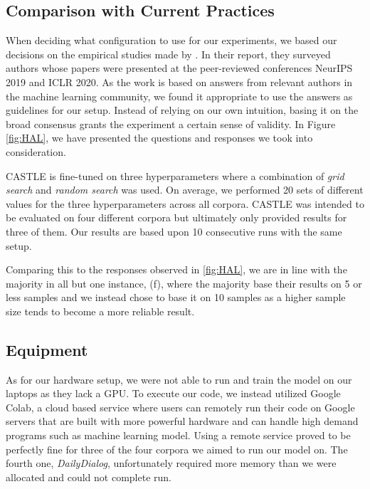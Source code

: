 \documentclass[nofilelist]{cslthse-msc}
\begin{document}
\subsection{Comparison with Current Practices}
When deciding what configuration to use for our experiments, we based our decisions on the empirical studies made by  \citet{bouthillier:hal-02447823}. In their report, they surveyed authors whose papers were presented at the peer-reviewed conferences NeurIPS 2019 and ICLR 2020. As the work is based on answers from relevant authors in the machine learning community, we found it appropriate to use the answers as guidelines for our setup. Instead of relying on our own intuition, basing it on the broad consensus grants the experiment a certain sense of validity. In Figure \ref{fig:HAL}, we have presented the questions and responses we took into consideration.

CASTLE is fine-tuned on three hyperparameters where a combination of \textit{grid search} and \textit{random search} was used. On average, we performed 20 sets of different values for the three hyperparameters across all corpora. CASTLE was intended to be evaluated on four different corpora but ultimately only provided results for three of them. Our results are based upon 10 consecutive runs with the same setup. 

Comparing this to the responses observed in \ref{fig:HAL}, we are in line with the majority in all but one instance, (f), where the majority base their results on 5 or less samples and we instead chose to base it on 10 samples as a higher sample size tends to become a more reliable result.

\subsection{Equipment}
As for our hardware setup, we were not able to run and train the model on our laptops as they lack a GPU. To execute our code, we instead utilized Google Colab, a cloud based service where users can remotely run their code on Google servers that are built with more powerful hardware and can handle high demand programs such as machine learning model. Using a remote service proved to be perfectly fine for three of the four corpora we aimed to run our model on. The fourth one, \textit{DailyDialog}, unfortunately required more memory than we were allocated and could not complete run.


\end{document}
